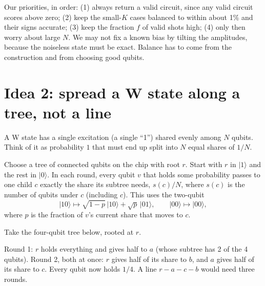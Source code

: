 \documentclass[11pt]{scrartcl}
\newcommand{\ket}[1]{\lvert #1\rangle}
\begin{document}
\begin{remark}[Takeaway]
  Our priorities, in order: (1) always return a valid circuit, since any valid circuit scores above
  zero; (2) keep the small-$K$ cases balanced to within about 1\% and their signs accurate; (3) keep
  the fraction $f$ of valid shots high; (4) only then worry about large $N$. We may not fix a known
  bias by tilting the amplitudes, because the noiseless state must be exact. Balance has to come
  from the construction and from choosing good qubits.
\end{remark}

\section{Idea 2: spread a W state along a tree, not a line}

A W state has a single excitation (a single ``1'') shared evenly among $N$ qubits. Think of it as
probability $1$ that must end up split into $N$ equal shares of $1/N$.

\begin{algorithm*}
  Choose a tree of connected qubits on the chip with root $r$. Start with $r$ in $\ket1$ and the
  rest in $\ket0$. In each round, every qubit $v$ that holds some probability passes to one child $c$
  exactly the share its subtree needs, $s(c)/N$, where $s(c)$ is the number of qubits under $c$
  (including $c$). This uses the two-qubit 
  \[
    \ket{10}\mapsto\sqrt{1-p}\,\ket{10}+\sqrt p\,\ket{01},\qquad \ket{00}\mapsto\ket{00},
  \]
  where $p$ is the fraction of $v$'s current share that moves to $c$.
\end{algorithm*}

\begin{example}
  Take the four-qubit tree below, rooted at $r$.
  \begin{center}
  \end{center}
  Round 1: $r$ holds everything and gives half to $a$ (whose subtree has 2 of the 4 qubits).
  Round 2, both at once: $r$ gives half of its share to $b$, and $a$ gives half of its share to $c$.
  Every qubit now holds $1/4$. A line $r-a-c-b$ would need three rounds.
\end{example}
\end{document}
